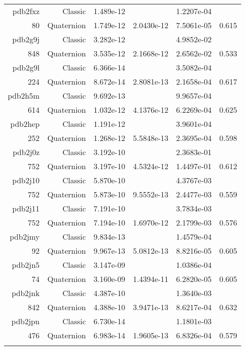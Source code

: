 \begin{xltabular}{\textwidth}{r|rS[table-format=1.3e+2]S[table-format=1.4e+2]S[table-format=1.4e+2]S[table-format=-1.3]}
pdb2fxz & Classic & 1.489e-12 &  & 1.2207e-04 & \\
80 & Quaternion & 1.749e-12 & 2.0430e-12 & 7.5061e-05 & 0.615\\  \addlinespace
{\color{red} pdb2g9j } & Classic & 3.282e-12 &  & 4.9852e-02 & \\
848 & Quaternion & 3.535e-12 & 2.1668e-12 & 2.6562e-02 & 0.533\\  \addlinespace
pdb2g9l & Classic & 6.366e-14 &  & 3.5082e-04 & \\
224 & Quaternion & 8.672e-14 & 2.8081e-13 & 2.1658e-04 & 0.617\\  \addlinespace
pdb2h5m & Classic & 9.692e-13 &  & 9.9657e-04 & \\
614 & Quaternion & 1.032e-12 & 4.1376e-12 & 6.2269e-04 & 0.625\\  \addlinespace
pdb2hep & Classic & 1.191e-12 &  & 3.9601e-04 & \\
252 & Quaternion & 1.268e-12 & 5.5848e-13 & 2.3695e-04 & 0.598\\  \addlinespace
{\color{red} pdb2j0z } & Classic & 3.192e-10 &  & 2.3683e-01 & \\
752 & Quaternion & 3.197e-10 & 4.5324e-12 & 1.4497e-01 & 0.612\\  \addlinespace
{\color{red} pdb2j10 } & Classic & 5.870e-10 &  & 4.3767e-03 & \\
752 & Quaternion & 5.873e-10 & 9.5552e-13 & 2.4477e-03 & 0.559\\  \addlinespace
{\color{red} pdb2j11 } & Classic & 7.191e-10 &  & 3.7834e-03 & \\
752 & Quaternion & 7.194e-10 & 1.6970e-12 & 2.1799e-03 & 0.576\\  \addlinespace
pdb2jmy & Classic & 9.834e-13 &  & 1.4579e-04 & \\
92 & Quaternion & 9.967e-13 & 5.0812e-13 & 8.8216e-05 & 0.605\\  \addlinespace
pdb2jn5 & Classic & 3.147e-09 &  & 1.0386e-04 & \\
74 & Quaternion & 3.160e-09 & 1.4394e-11 & 6.2820e-05 & 0.605\\  \addlinespace
pdb2jnk & Classic & 4.387e-10 &  & 1.3640e-03 & \\
842 & Quaternion & 4.388e-10 & 3.9471e-13 & 8.6217e-04 & 0.632\\  \addlinespace
pdb2jpn & Classic & 6.730e-14 &  & 1.1801e-03 & \\
476 & Quaternion & 6.983e-14 & 1.9605e-13 & 6.8326e-04 & 0.579\\  \addlinespace

\end{xltabular}
